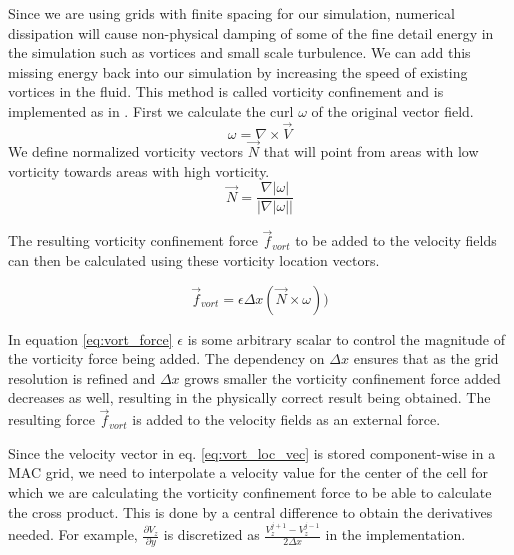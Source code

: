 Since we are using grids with finite spacing for our simulation, numerical dissipation will cause non-physical damping of some of the fine detail energy in the simulation such as vortices and small scale turbulence. We can add this missing energy back into our simulation by increasing the speed of existing vortices in the fluid. This method is called vorticity confinement and is implemented as in \cite{Nguyen02}. First we calculate the curl $\omega$ of the original vector field.
\begin{equation}
\label{eq:vorticity}
\omega = \nabla \times \vec{V}
\end{equation}
We define normalized vorticity vectors $\vec{N}$ that will point from areas with low vorticity towards areas with high vorticity.
\begin{equation}
\label{eq:vort_loc_vec}
\vec{N} = \frac{\nabla |\omega|}{|\nabla |\omega ||}
\end{equation}

The resulting vorticity confinement force $\vec{f}_{vort}$ to be added to the velocity fields can then be calculated using these vorticity location vectors.

\begin{equation}
\label{eq:vort_force}
	\vec{f}_{vort} = \epsilon\Delta x(\vec{N}\times\omega))
\end{equation}

In equation \ref{eq:vort_force} $\epsilon$ is some arbitrary scalar to control the magnitude of the vorticity force being added. The dependency on $\Delta x$ ensures that as the grid resolution is refined and $\Delta x$ grows smaller the vorticity confinement force added decreases as well, resulting in the physically correct result being obtained. The resulting force $\vec{f}_{vort}$ is added to the velocity fields as an external force.

Since the velocity vector in eq. \ref{eq:vort_loc_vec} is stored component-wise in a MAC grid, we need to interpolate a velocity value for the center of the cell for which we are calculating the vorticity confinement force to be able to calculate the cross product. This is done by a central difference to obtain the derivatives needed. For example, $\frac{\partial V_z}{\partial y}$ is discretized as $\frac{V^{j+1}_z - V^{j-1}_z}{2\Delta x}$ in the implementation.